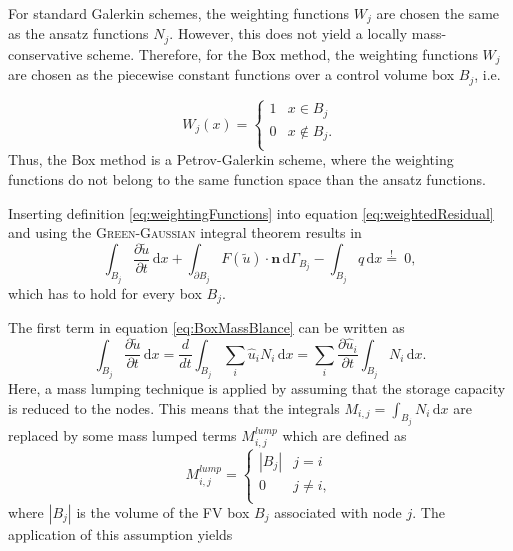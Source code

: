 For standard Galerkin schemes, the weighting functions $W_j$ are chosen the same as the ansatz functions $N_j$. However, this does not yield a locally mass-conservative scheme. 
Therefore, for the Box method, the weighting functions $W_j$ are chosen as 
the piecewise constant functions over a
control volume box $B_j$, i.e.

\begin{equation}
	W_j(x) = \begin{cases}
	          1 &x \in B_j \\
		  0 &x \notin B_j.\\
	         \end{cases}
\label{eq:weightingFunctions}	         
\end{equation}
Thus, the Box method is a Petrov-Galerkin scheme, where the weighting functions do not belong to the same function space than the ansatz functions.

Inserting definition \eqref{eq:weightingFunctions} into equation \eqref{eq:weightedResidual} and using the \textsc{Green-Gaussian} integral theorem results in
\begin{equation}
	\int_{B_j} \frac{\partial \tilde u}{\partial t} \, \mathrm{d}x + \int_{\partial B_j}  F(\tilde u) \cdot \mathbf n \, \mathrm{d}\Gamma_{B_j} - \int_{B_j} q \, \mathrm{d}x  \overset {!}{=} \: 0, 	
\label{eq:BoxMassBlance}	
\end{equation}
which has to hold for every box $B_j$. 

The first term in equation \eqref{eq:BoxMassBlance} can be written as
\begin{equation}
\int_{B_j} \frac{\partial \tilde u}{\partial t} \, \mathrm{d}x = \frac{d}{dt} \int_{B_j} \sum_i \hat u_i N_i  \, \mathrm{d}x = \sum_i \frac{\partial \hat u_i}{\partial t} \int_{B_j}  N_i  \, \mathrm{d}x.
\end{equation} 
Here, a mass lumping technique is applied by assuming that the storage capacity is
reduced to the nodes. This means that the integrals $M_{i,j} = \int_{B_j}  N_i \, \mathrm{d}x$
are replaced by some mass lumped terms $M^{lump}_{i,j}$ which are defined as
\begin{equation}
	 M^{lump}_{i,j} =\begin{cases}  |B_j| &j = i\\
	0 &j \neq i,\\
	         \end{cases}
\end{equation}
where $|B_j|$ is the volume of the FV box $B_j$ associated with node $j$.
The application of this assumption yields

